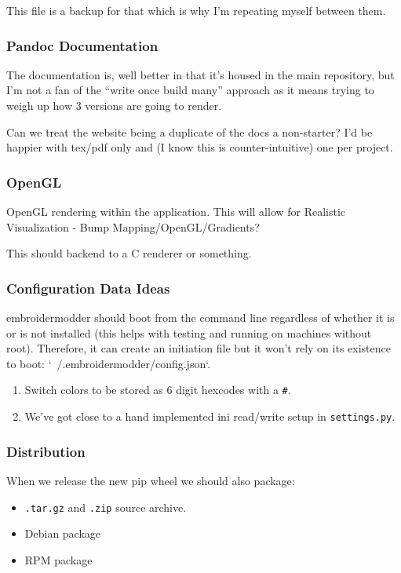 \documentclass[a4paper, 11pt]{report}
\begin{document}
This file is a backup for that which is why I'm repeating myself between them.

\subsubsection{Pandoc Documentation}

The documentation is, well better in that it's housed in the main repository,
but I'm not a fan of the ``write once build many'' approach as it means
trying to weigh up how 3 versions are going to render.

Can we treat the website being a duplicate of the docs a non-starter?
I'd be happier with tex/pdf only and (I know this is counter-intuitive) one
per project.

\subsubsection{OpenGL}

OpenGL rendering within the application. This will allow for
Realistic Visualization - Bump Mapping/OpenGL/Gradients?

This should backend to a C renderer or something.

\subsubsection{Configuration Data Ideas}

embroidermodder should boot from the command line
regardless of whether it is or is not installed (this helps with testing and
running on machines without root). Therefore, it can create an initiation file
but it won't rely on its existence to boot: `~/.embroidermodder/config.json`.

\begin{enumerate}
\item Switch colors to be stored as 6 digit hexcodes with a \texttt{\#}.
\item We've got close to a hand implemented ini read/write setup in \texttt{settings.py}.
\end{enumerate}

\subsubsection{Distribution}

When we release the new pip wheel we should also package:

\begin{itemize}
\item \texttt{.tar.gz} and \texttt{.zip} source archive.
\item Debian package
\item RPM package
\end{itemize}
\end{document}
